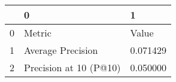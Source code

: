 \begin{tabular}{lll}
\toprule
 & 0 & 1 \\
\midrule
0 & Metric & Value \\
1 & Average Precision & 0.071429 \\
2 & Precision at 10 (P@10) & 0.050000 \\
\bottomrule
\end{tabular}
